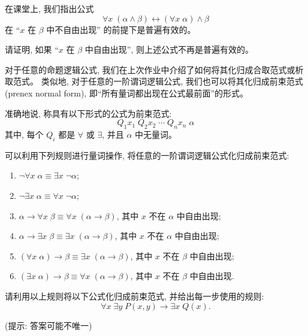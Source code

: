\documentclass[a4paper, justified]{tufte-handout}
\begin{document}
\begin{solution}
\end{solution}

\begin{problem}
  在课堂上, 我们指出公式
  \[
    \forall x\; (\alpha \land \beta)
      \leftrightarrow (\forall x\; \alpha) \land \beta
  \]
  在 ``$x$ 在 $\beta$ 中不自由出现'' 的前提下是普遍有效的。

  \noindent 请证明, 如果 ``$x$ 在 $\beta$ 中自由出现'',
  则上述公式不再是普遍有效的。
\end{problem}

\begin{solution}
\end{solution}

\begin{problem}
  对于任意的命题逻辑公式,
  我们在上次作业中介绍了如何将其化归成合取范式或析取范式。
  类似地, 对于任意的一阶谓词逻辑公式,
  我们也可以将其化归成前束范式 (prenex normal form),
  即``所有量词都出现在公式最前面''的形式。

  准确地说, 称具有以下形式的公式为前束范式:
  \[
    Q_1 x_1\; Q_2 x_2\; \cdots\; Q_n x_n\; \alpha
  \]
  其中, 每个 $Q_i$ 都是 $\forall$ 或 $\exists$,
  并且 $\alpha$ 中无量词。

  可以利用下列规则进行量词操作, 将任意的一阶谓词逻辑公式化归成前束范式:
  \begin{enumerate}[label = \textbf{R\arabic*}]
    \item $\lnot \forall x\; \alpha \equiv \exists x\; \lnot \alpha$;
    \item $\lnot \exists x\; \alpha \equiv \forall x\; \lnot \alpha$;
    \item $\alpha \to \forall x\; \beta \equiv \forall x\; (\alpha \to \beta)$,
      其中 $x$ 不在 $\alpha$ 中自由出现;
    \item $\alpha \to \exists x\; \beta \equiv \exists x\; (\alpha \to \beta)$,
      其中 $x$ 不在 $\alpha$ 中自由出现;
    \item $(\forall x\; \alpha) \to \beta \equiv \exists x\; (\alpha \to \beta)$,
      其中 $x$ 不在 $\beta$ 中自由出现;
    \item $(\exists x\; \alpha) \to \beta \equiv \forall x\; (\alpha \to \beta)$,
      其中 $x$ 不在 $\beta$ 中自由出现.
  \end{enumerate}

  请利用以上规则将以下公式化归成前束范式,
  并给出每一步使用的规则:
  \[
    \forall x\; \exists y\; P(x, y) \to \exists x\; Q(x).
  \]

  (提示: 答案可能不唯一)
\end{problem}
\end{document}
